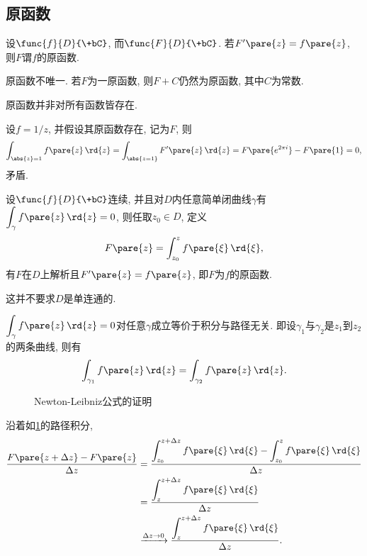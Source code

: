 \documentclass[../ComplexVariable.tex]{subfiles}
\begin{document}
\subsection{原函数} %
\label{sub:原函数}

\begin{definition}[原函数]
    设$\func{f}{D}{\+bC}$, 而$\func{F}{D}{\+bC}$. 若$F'\pare{z}=f\pare{z}$, 则$F$谓$f$的原函数.
\end{definition}
\begin{remark}
    原函数不唯一. 若$F$为一原函数, 则$F+C$仍然为原函数, 其中$C$为常数.
\end{remark}
原函数并非对所有函数皆存在.
\begin{ex}
    设$f=1/z$, 并假设其原函数存在, 记为$F$, 则
    \[ \int_{\abs{z}=1}f\pare{z}\,\rd{z} = \int_{\abs{z=1}}F'\pare{z}\,\rd{z} = F\pare{e^{2\pi i}} - F\pare{1} = 0, \]
    矛盾.
\end{ex}
\begin{theorem}
    \label{thm:原函数的存在性}
    设$\func{f}{D}{\+bC}$连续, 并且对$D$内任意简单闭曲线$\gamma$有$\displaystyle \int_\gamma f\pare{z}\,\rd{z} = 0$, 则任取$z_0 \in D$, 定义
    \[ F\pare{z} = \int_{z_0}^z f\pare{\xi}\,\rd{\xi}, \]
    有$F$在$D$上解析且$F'\pare{z} = f\pare{z}$, 即$F$为$f$的原函数.
\end{theorem}
\begin{remark}
    这并不要求$D$是单连通的.
\end{remark}
\begin{remark}
    $\displaystyle \int_\gamma f\pare{z}\,\rd{z} = 0$对任意$\gamma$成立等价于积分与路径无关. 即设$\gamma_1$与$\gamma_2$是$z_1$到$z_2$的两条曲线, 则有
    \[ \int_{\gamma_1} f\pare{z}\,\rd{z} = \int_{\gamma_2}f\pare{z}\,\rd{z}. \]
\end{remark}
\begin{figure}[ht]
    \centering
    \caption{Newton-Leibniz公式的证明}
    \label{fig:Newton-Leibniz公式的证明}
\end{figure}
沿着如\cref{fig:Newton-Leibniz公式的证明}的路径积分,
\begin{align*}
    \frac{F\pare{z+\Delta z} - F\pare{z}}{\Delta z} &= \frac{\displaystyle \int_{z_0} ^{z+\Delta z} f\pare{\xi}\,\rd{\xi} - \int_{z_0}^z f\pare{\xi}\,\rd{\xi}}{\Delta z} \\
    &= \frac{\displaystyle \int_z^{z+\Delta z}f\pare{\xi}\,\rd{\xi}}{\Delta z} \\
    & \xrightarrow{\Delta z \rightarrow 0} \frac{\displaystyle \int_z^{z+\Delta z}f\pare{\xi}\,\rd{\xi}}{\Delta z}.
\end{align*}
\end{document}
